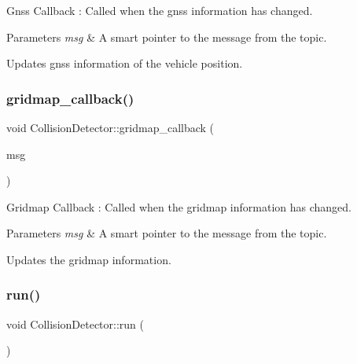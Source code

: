 Gnss Callback \+: Called when the gnss information has changed. 


\begin{DoxyParams}{Parameters}
{\em msg} & A smart pointer to the message from the topic.\\
\hline
\end{DoxyParams}
Updates gnss information of the vehicle position. \mbox{\label{classCollisionDetector_a47d78bbe04c6b7ceb2ba143c67e8388b}} 
\subsubsection{\texorpdfstring{gridmap\+\_\+callback()}{gridmap\_callback()}}
{\footnotesize\ttfamily void Collision\+Detector\+::gridmap\+\_\+callback (\begin{DoxyParamCaption}\item[{const grid\+\_\+map\+\_\+msgs\+::\+Grid\+Map\+::\+Const\+Ptr \&}]{msg }\end{DoxyParamCaption})\hspace{0.3cm}{\ttfamily [inline]}}



Gridmap Callback \+: Called when the gridmap information has changed. 


\begin{DoxyParams}{Parameters}
{\em msg} & A smart pointer to the message from the topic.\\
\hline
\end{DoxyParams}
Updates the gridmap information. \mbox{\label{classCollisionDetector_ade868f8b060fec62a139e1694d714f86}} 
\subsubsection{\texorpdfstring{run()}{run()}}
{\footnotesize\ttfamily void Collision\+Detector\+::run (\begin{DoxyParamCaption}{ }\end{DoxyParamCaption})\hspace{0.3cm}{\ttfamily [inline]}}



